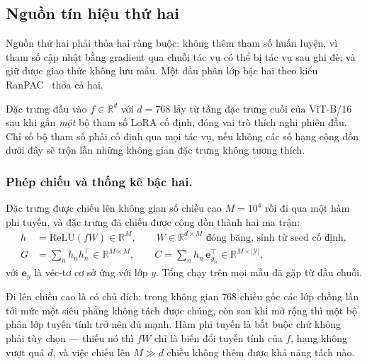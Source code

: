 \documentclass[runningheads]{llncs}
\begin{document}
\subsection{Nguồn tín hiệu thứ hai}

Nguồn thứ hai phải thỏa hai ràng buộc: không thêm tham số huấn luyện, vì tham số
cập nhật bằng gradient qua chuỗi tác vụ có thể bị tác vụ sau ghi đè; và giữ được
giao thức không lưu mẫu. Một đầu phân lớp bậc hai theo kiểu RanPAC~\cite{ref_ranpac}
thỏa cả hai.

Đặc trưng đầu vào $f \in \mathbb{R}^{d}$ với $d = 768$ lấy từ tầng đặc trưng cuối
của ViT-B/16 sau khi gắn \emph{một} bộ tham số LoRA cố định, đóng vai trò thích
nghi phiên đầu. Chỉ số bộ tham số phải cố định qua mọi tác vụ, nếu không các số
hạng cộng dồn dưới đây sẽ trộn lẫn những không gian đặc trưng không tương thích.

\subsubsection{Phép chiếu và thống kê bậc hai.}
Đặc trưng được chiếu lên không gian số chiều cao $M = 10^4$ rồi đi qua một hàm
phi tuyến, và đặc trưng đã chiếu được cộng dồn thành hai ma trận:
\begin{align}
h &= \mathrm{ReLU}(f W) \in \mathbb{R}^{M},
\qquad W \in \mathbb{R}^{d \times M} \text{ đóng băng, sinh từ seed cố định},
\label{eq:proj}\\
G &= \sum_n h_n h_n^{\top} \in \mathbb{R}^{M \times M},
\qquad
C = \sum_n h_n\, \mathbf{e}_{y_n}^{\top}
   \in \mathbb{R}^{M \times |\mathcal{Y}|},
\label{eq:gram}
\end{align}
với $\mathbf{e}_{y}$ là véc-tơ cơ sở ứng với lớp $y$. Tổng chạy trên mọi mẫu đã
gặp từ đầu chuỗi.

Đi lên chiều cao là có chủ đích: trong không gian $768$ chiều gốc các lớp chồng
lấn tới mức một siêu phẳng không tách được chúng, còn sau khi mở rộng thì một bộ
phân lớp tuyến tính trở nên đủ mạnh. Hàm phi tuyến là bắt buộc chứ không phải tùy
chọn --- thiếu nó thì $fW$ chỉ là biến đổi tuyến tính của $f$, hạng không vượt quá
$d$, và việc chiếu lên $M \gg d$ chiều không thêm được khả năng tách nào.
\end{document}
